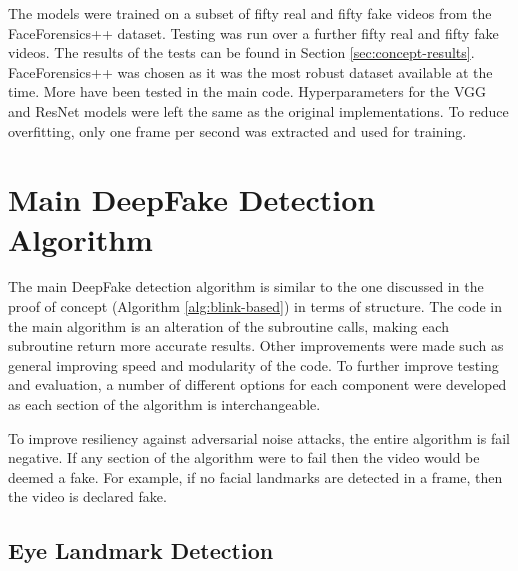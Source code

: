 The models were trained on a subset of fifty real and fifty fake videos from the FaceForensics++ dataset\cite{roessler2018faceforensics}. Testing was run over a further fifty real and fifty fake videos. The results of the tests can be found in Section \ref{sec:concept-results}. FaceForensics++ was chosen as it was the most robust dataset available at the time. More have been tested in the main code. Hyperparameters for the VGG and ResNet models were left the same as the original implementations. To reduce overfitting, only one frame per second was extracted and used for training.

\section{Main DeepFake Detection Algorithm}


The main DeepFake detection algorithm is similar to the one discussed in the proof of concept (Algorithm \ref{alg:blink-based}) in terms of structure. The code in the main algorithm is an alteration of the subroutine calls, making each subroutine return more accurate results. Other improvements were made such as general improving speed and modularity of the code. To further improve testing and evaluation, a number of different options for each component were developed as each section of the algorithm is interchangeable. 

To improve resiliency against adversarial noise attacks, the entire algorithm is fail negative. If any section of the algorithm were to fail then the video would be deemed a fake. For example, if no facial landmarks are detected in a frame, then the video is declared fake.

\subsection{Eye Landmark Detection}


